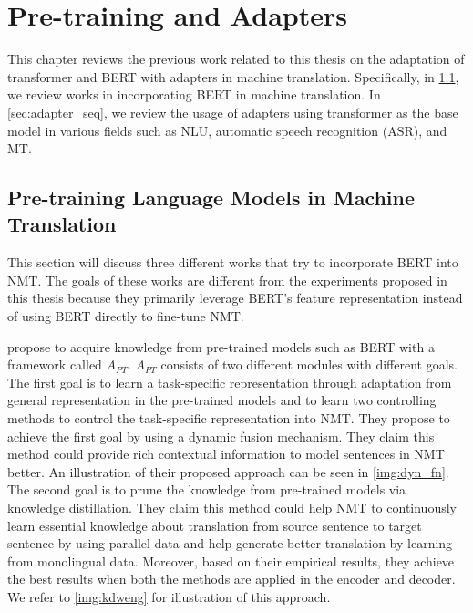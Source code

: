 \chapter{Pre-training and Adapters}

This chapter reviews the previous work related to this thesis on the adaptation of transformer and BERT with adapters in machine translation. Specifically, in \cref{sec:prelm_mt}, we review works in incorporating BERT in machine translation. In \cref{sec:adapter_seq}, we review the usage of adapters using transformer as the base model in various fields such as NLU, automatic speech recognition (ASR), and MT.

\section{Pre-training Language Models in Machine Translation}
\label{sec:prelm_mt}

This section will discuss three different works that try to incorporate BERT into NMT. The goals of these works are different from the experiments proposed in this thesis because they primarily leverage BERT's feature representation instead of using BERT directly to fine-tune NMT.

 propose to acquire knowledge from pre-trained models such as BERT with a framework called $A_{PT}$. $A_{PT}$ consists of two different modules with different goals. The first goal is to learn a task-specific representation through adaptation from general representation in the pre-trained models and to learn two controlling methods to control the task-specific representation into NMT. They propose to achieve the first goal by using a dynamic fusion mechanism. They claim this method could provide rich contextual information to model sentences in NMT better. An illustration of their proposed approach can be seen in \cref{img:dyn_fn}. The second goal is to prune the knowledge from pre-trained models via knowledge distillation. They claim this method could help NMT to continuously learn essential knowledge about translation from source sentence to target sentence by using parallel data and help generate better translation by learning from monolingual data. Moreover, based on their empirical results, they achieve the best results when both the methods are applied in the encoder and decoder. We refer to \cref{img:kdweng} for illustration of this approach.

